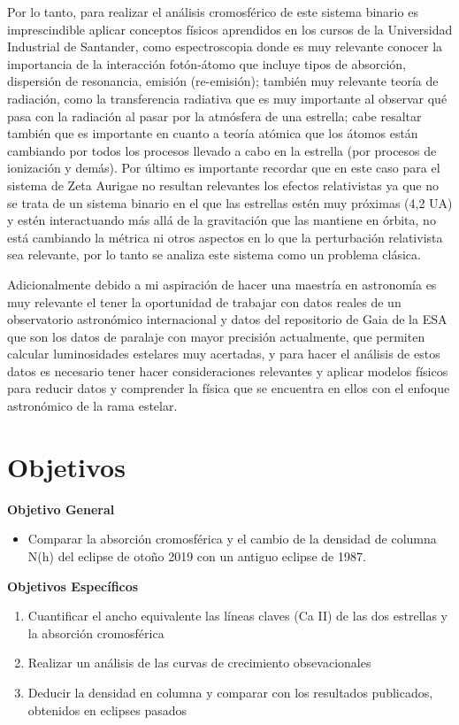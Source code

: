 \documentclass[11pt]{article}
\begin{document}
Por lo tanto, para realizar el análisis cromosférico de este sistema binario es imprescindible aplicar conceptos físicos aprendidos en los cursos de la Universidad Industrial de Santander, como espectroscopia donde es muy relevante conocer la importancia de la interacción fotón-átomo que incluye tipos de absorción, dispersión de resonancia, emisión (re-emisión); también muy relevante teoría de radiación, como la transferencia radiativa que es muy importante al observar qué pasa con la radiación al pasar por la atmósfera de una estrella; cabe resaltar también que es importante en cuanto a teoría atómica que los átomos están cambiando por todos los procesos llevado a cabo en la estrella (por procesos de ionización y demás). Por último es importante recordar que en este caso para el sistema de Zeta Aurigae no resultan relevantes los efectos relativistas ya que no se trata de un sistema binario en el que las estrellas estén muy próximas (4,2 UA) y estén interactuando más allá de la gravitación que las mantiene en órbita, no está cambiando la métrica ni otros aspectos en lo que la perturbación relativista sea relevante, por lo tanto se analiza este sistema como un problema clásica.

\noindent Adicionalmente debido a mi aspiración de hacer una maestría en astronomía es muy relevante el tener la oportunidad de trabajar con datos reales de un observatorio astronómico internacional y datos del repositorio de Gaia de la ESA que son los datos de paralaje con mayor precisión actualmente, que permiten calcular luminosidades estelares muy acertadas, y para hacer el análisis de estos datos es necesario tener hacer consideraciones relevantes y aplicar modelos físicos para reducir datos y comprender la física que se encuentra en ellos con el enfoque astronómico de la rama estelar.

\section{Objetivos}

\textbf{Objetivo General}

\begin{itemize}
\item Comparar la absorción cromosférica y el cambio de la densidad de columna N(h) del eclipse de otoño 2019 con un antiguo eclipse de 1987.
\end{itemize}
\textbf{Objetivos Espec\'ificos}
\begin{enumerate}
    \item Cuantificar el ancho equivalente las líneas claves (Ca II) de las dos estrellas y la  absorción cromosférica

    \item Realizar un análisis de las curvas de crecimiento obsevacionales

    \item Deducir la densidad en columna y comparar con los resultados publicados, obtenidos en eclipses pasados
\end{enumerate}
\end{document}
